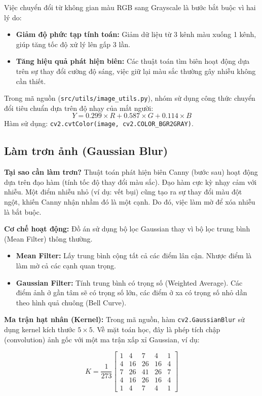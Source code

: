 \documentclass[6pt, a4paper]{report}
\begin{document}
	Việc chuyển đổi từ không gian màu RGB sang Grayscale là bước bắt buộc vì hai lý do:
	\begin{itemize}
		\item \textbf{Giảm độ phức tạp tính toán:} Giảm dữ liệu từ 3 kênh màu xuống 1 kênh, giúp tăng tốc độ xử lý lên gấp 3 lần.
		\item \textbf{Tăng hiệu quả phát hiện biên:} Các thuật toán tìm biên hoạt động dựa trên sự thay đổi cường độ sáng, việc giữ lại màu sắc thường gây nhiễu không cần thiết.
	\end{itemize}
	
	Trong mã nguồn (\texttt{src/utils/image\_utils.py}), nhóm sử dụng công thức chuyển đổi tiêu chuẩn dựa trên độ nhạy của mắt người:
	\begin{equation}
		Y = 0.299 \times R + 0.587 \times G + 0.114 \times B
	\end{equation}
	Hàm sử dụng: \texttt{cv2.cvtColor(image, cv2.COLOR\_BGR2GRAY)}.
	
	\subsection{Làm trơn ảnh (Gaussian Blur)}
	
	\textbf{Tại sao cần làm trơn?}
	Thuật toán phát hiện biên Canny (bước sau) hoạt động dựa trên đạo hàm (tính tốc độ thay đổi màu sắc). Đạo hàm cực kỳ nhạy cảm với nhiễu. Một điểm nhiễu nhỏ (ví dụ: vết bụi) cũng tạo ra sự thay đổi màu đột ngột, khiến Canny nhận nhầm đó là một cạnh. Do đó, việc làm mờ để xóa nhiễu là bắt buộc.
	
	\textbf{Cơ chế hoạt động:}
	Đồ án sử dụng bộ lọc Gaussian thay vì bộ lọc trung bình (Mean Filter) thông thường.
	\begin{itemize}
		\item \textbf{Mean Filter:} Lấy trung bình cộng tất cả các điểm lân cận. Nhược điểm là làm mờ cả các cạnh quan trọng.
		\item \textbf{Gaussian Filter:} Tính trung bình có trọng số (Weighted Average). Các điểm ảnh ở gần tâm sẽ có trọng số lớn, các điểm ở xa có trọng số nhỏ dần theo hình quả chuông (Bell Curve).
	\end{itemize}
	
	\textbf{Ma trận hạt nhân (Kernel):}
	Trong mã nguồn, hàm \texttt{cv2.GaussianBlur} sử dụng kernel kích thước $5 \times 5$. Về mặt toán học, đây là phép tích chập (convolution) ảnh gốc với một ma trận xấp xỉ Gaussian, ví dụ:
	
	\begin{equation}
		K = \frac{1}{273} 
		\begin{bmatrix} 
			1 & 4 & 7 & 4 & 1 \\ 
			4 & 16 & 26 & 16 & 4 \\ 
			7 & 26 & 41 & 26 & 7 \\ 
			4 & 16 & 26 & 16 & 4 \\ 
			1 & 4 & 7 & 4 & 1 
		\end{bmatrix}
	\end{equation}
	
\end{document}
